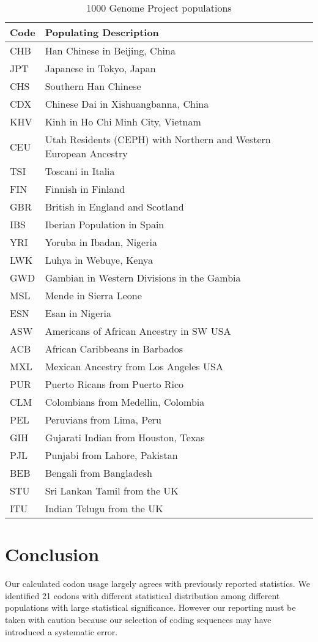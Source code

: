 \documentclass{article}
\begin{document}
\begin{table}[p]
  \centering
  \begin{tabular}{|l|l|}
    \hline
    \bf{Code} & \bf{Populating Description} \\
    \hline
    CHB & Han Chinese in Beijing, China \\
    JPT & Japanese in Tokyo, Japan \\
    CHS & Southern Han Chinese \\
    CDX & Chinese Dai in Xishuangbanna, China \\
    KHV & Kinh in Ho Chi Minh City, Vietnam \\
    CEU & Utah Residents (CEPH) with Northern and Western European Ancestry \\
    TSI & Toscani in Italia \\
    FIN & Finnish in Finland \\
    GBR & British in England and Scotland \\
    IBS & Iberian Population in Spain \\
    YRI & Yoruba in Ibadan, Nigeria \\
    LWK & Luhya in Webuye, Kenya \\
    GWD & Gambian in Western Divisions in the Gambia \\
    MSL & Mende in Sierra Leone \\
    ESN & Esan in Nigeria \\
    ASW & Americans of African Ancestry in SW USA \\
    ACB & African Caribbeans in Barbados \\
    MXL & Mexican Ancestry from Los Angeles USA \\
    PUR & Puerto Ricans from Puerto Rico \\
    CLM & Colombians from Medellin, Colombia \\
    PEL & Peruvians from Lima, Peru \\
    GIH & Gujarati Indian from Houston, Texas \\
    PJL & Punjabi from Lahore, Pakistan \\
    BEB & Bengali from Bangladesh \\
    STU & Sri Lankan Tamil from the UK \\
    ITU & Indian Telugu from the UK \\
    \hline
  \end{tabular}
  \caption{1000 Genome Project populations\cite{1000genomes}}
  \label{table:pupulations}
\end{table}

\section{Conclusion}

Our calculated codon usage largely agrees with previously reported statistics.
We identified 21 codons with different statistical distribution among different
populations with large statistical significance. However our reporting must be
taken with caution because our selection of coding sequences may have
introduced a systematic error.

\clearpage
\printbibliography
\end{document}
